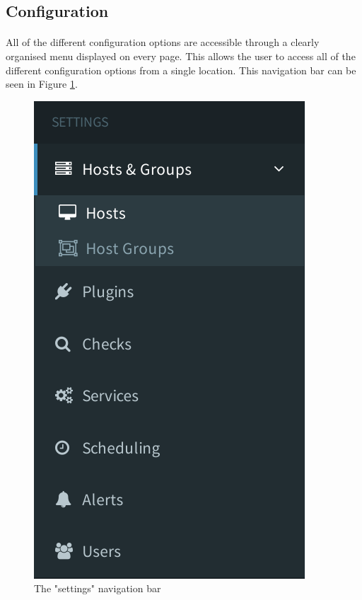 \documentclass[bsc,logo,twoside,singlespacing,notimes]{infthesis}
\begin{document}

\subsection{Configuration}
\paragraph*{}
	All of the different configuration options are accessible through a clearly
	organised menu displayed on every page.  This allows the user to access all of
	the different configuration options from a single location.  This navigation
	bar can be seen in Figure \ref{settings-nav}.

\begin{figure}[H]
	\centering
	\caption{The "settings" navigation bar}
	\label{settings-nav}
	\includegraphics[scale=0.7]{assets/screenshots/settings-nav.pdf}
\end{figure}
	
\end{document}
